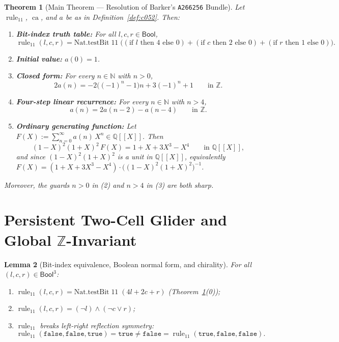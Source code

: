 \documentclass[11pt]{article}
\newcommand{\llbracket}{[\![}
\newcommand{\rrbracket}{]\!]}
\newtheorem{theorem}{Theorem}[section]
\newtheorem{lemma}[theorem]{Lemma}
\theoremstyle{definition}
\newcommand{\N}{\mathbb{N}}
\newcommand{\Z}{\mathbb{Z}}
\newcommand{\Q}{\mathbb{Q}}
\newcommand{\seq}[1]{\texttt{#1}}
\newcommand{\ruleTT}{\operatorname{rule}_{11}}
\newcommand{\ca}{\operatorname{ca}}
\begin{document}
\begin{theorem}[Main Theorem --- Resolution of Barker's \seq{A266256} Bundle]
\label{thm:main}
Let $\ruleTT$, $\ca$, and $a$ be as in Definition~\ref{def:c052}. Then:
\begin{enumerate}
\item[\textup{(0)}] \textbf{Bit-index truth table:} For all $l, c, r \in \mathsf{Bool}$,
\[
\ruleTT(l, c, r) = \mathrm{Nat.testBit}\;11\;\bigl((\text{if } l \text{ then } 4 \text{ else } 0) + (\text{if } c \text{ then } 2 \text{ else } 0) + (\text{if } r \text{ then } 1 \text{ else } 0)\bigr).
\]
\item[\textup{(1)}] \textbf{Initial value:} $a(0) = 1$.
\item[\textup{(2)}] \textbf{Closed form:} For every $n \in \N$ with $n > 0$,
\[
2 a(n) = -2\bigl((-1)^n - 1\bigr)n + 3(-1)^n + 1 \qquad \text{in }\Z.
\]
\item[\textup{(3)}] \textbf{Four-step linear recurrence:} For every $n \in \N$ with $n > 4$,
\[
a(n) = 2a(n - 2) - a(n - 4) \qquad \text{in }\Z.
\]
\item[\textup{(4)}] \textbf{Ordinary generating function:} Let $F(X) := \sum_{n=0}^{\infty} a(n)\,X^n \in \Q\llbracket X \rrbracket$. Then
\[
(1 - X)^2 (1 + X)^2 \, F(X) = 1 + X + 3X^3 - X^4 \qquad \text{in }\Q\llbracket X \rrbracket,
\]
and since $(1 - X)^2(1 + X)^2$ is a unit in $\Q\llbracket X \rrbracket$, equivalently $F(X) = (1 + X + 3X^3 - X^4)\cdot \bigl((1 - X)^2(1 + X)^2\bigr)^{-1}$.
\end{enumerate}
Moreover, the guards $n > 0$ in \textup{(2)} and $n > 4$ in \textup{(3)} are both sharp.
\end{theorem}

\section{Persistent Two-Cell Glider and Global \texorpdfstring{$\Z$}{Z}-Invariant}

\begin{lemma}[Bit-index equivalence, Boolean normal form, and chirality]
\label{lem:rule11}
For all $(l, c, r) \in \mathsf{Bool}^3$:
\begin{enumerate}
\item[\textup{(a)}] $\ruleTT(l, c, r) = \mathrm{Nat.testBit}\;11\;(4l + 2c + r)$ (Theorem~\ref{thm:main}\textup{(0)});
\item[\textup{(b)}] $\ruleTT(l, c, r) = (\neg l) \land (\neg c \lor r)$;
\item[\textup{(c)}] $\ruleTT$ breaks left-right reflection symmetry:
\[
\ruleTT(\mathtt{false}, \mathtt{false}, \mathtt{true}) = \mathtt{true} \ne \mathtt{false} = \ruleTT(\mathtt{true}, \mathtt{false}, \mathtt{false}).
\]
\end{enumerate}
\end{lemma}
\end{document}
